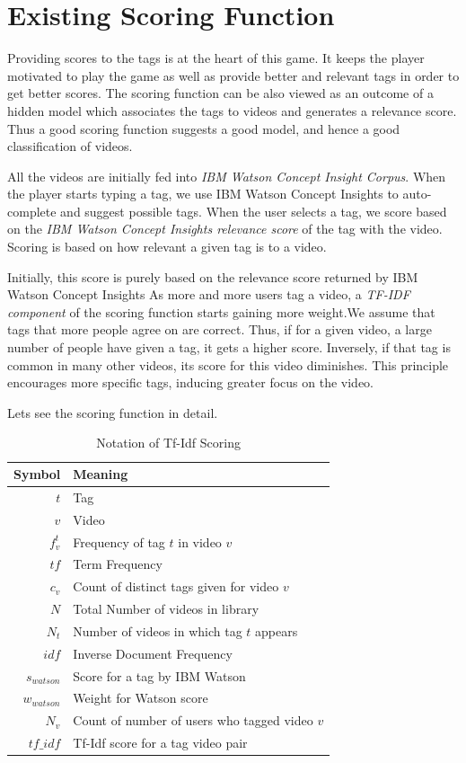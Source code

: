 \documentclass[12pt]{report}
\begin{document}
\pagebreak

\section{Existing Scoring Function}
Providing scores to the tags is at the heart of this game. It keeps the player motivated to play the game as well as provide better and relevant tags in order to get better scores. The scoring function can be also viewed as an outcome of a hidden model which associates the tags to videos and generates a relevance score. Thus a good scoring function suggests a good model, and hence a good classification of videos.

All the videos are initially fed into \emph{IBM Watson Concept Insight Corpus}. When the player starts typing a tag, we use IBM Watson Concept Insights to auto-complete and suggest possible tags. When the user selects a tag, we score based on the \emph{IBM Watson Concept Insights relevance score} of the tag with the video. Scoring is based on how relevant a given tag is to a video.

Initially, this score is purely based on the relevance score returned by IBM Watson Concept Insights
As more and more users tag a video, a \emph{TF-IDF component} of the scoring function starts gaining more weight.We assume that tags that more people agree on are correct. Thus, if for a given video, a large number of people have given a tag, it gets a higher score. Inversely, if that tag is common in many other videos, its score for this video diminishes. This principle encourages more specific tags, inducing greater focus on the video.

Lets see the scoring function in detail.

\begin{table}[htbp]\caption{Notation of Tf-Idf Scoring}
\begin{center}%
\begin{tabular}{r | p{10cm} }
\toprule
Symbol & Meaning\\
\hline
$t$ & Tag\\
$v$ & Video\\
$f^t_v$ & Frequency of tag $t$ in video $v$\\
$tf$ & Term Frequency\\
$c_v$ & Count of distinct tags given for video $v$\\
$N$ & Total Number of videos in library\\
$N_t$ & Number of videos in which tag $t$ appears\\
$idf$ & Inverse Document Frequency\\
$s_{watson}$ & Score for a tag by IBM Watson\\
$w_{watson}$ & Weight for Watson score\\
$N_v$ & Count of number of users who tagged video $v$\\
$tf\_idf$ & Tf-Idf score for a tag video pair\\
\bottomrule
\end{tabular}
\end{center}
\label{tab:TfIdfNotation}
\end{table}
\end{document}
